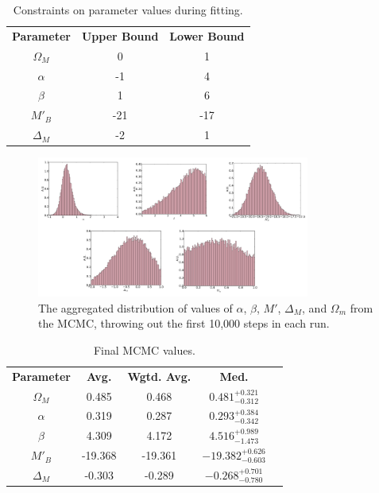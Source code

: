 \documentclass[aps,prl,reprint]{revtex4-1}
\begin{document}
\begin{table}
\begin{center}
\begin{tabular}{ |c|c|c| } 
 \hline
 \textbf{Parameter} & \textbf{Upper Bound} & \textbf{Lower Bound} \\ 
 $\Omega_M$ & 0 & 1 \\ 
 $\alpha$ & -1 & 4 \\ 
 $\beta$ & 1 & 6 \\ 
 $M'_B$ & -21 & -17 \\ 
$\Delta_M$ & -2 & 1 \\ 
 \hline
\end{tabular}
\caption{Constraints on parameter values during fitting.}\label{bounds}
\end{center}
\end{table}
\FloatBarrier
\onecolumngrid

\begin{figure}
\includegraphics[width=0.8\textwidth]{../plots/SN_hist.pdf}
\caption{\label{fig:hist}The aggregated distribution of values of $\alpha$, $\beta$, $M'$, $\Delta_M$, and $\Omega_m$ from the MCMC, throwing out the first 10,000 steps in each run.}
\end{figure}
\twocolumngrid
\begin{table}[t]
\begin{center}
\def\arraystretch{1.5}
\begin{tabular}{ |c|c|c|c|c| } 
 \hline
 \textbf{Parameter} & \textbf{Avg.} & \textbf{Wgtd. Avg.} & \textbf{Med.} \\ 
 $\Omega_M$ & 0.485 & 0.468 & $0.481^{+0.321}_{-0.312}$\\ 
 $\alpha$ & 0.319 & 0.287 & $0.293^{+0.384}_{-0.342}$\\ 
 $\beta$ & 4.309 & 4.172 &  $4.516^{+0.989}_{-1.473}$\\ 
 $M'_B$ & -19.368 & -19.361 & $-19.382^{+0.626}_{-0.603}$ \\ 
$\Delta_M$ & -0.303 &-0.289 & $-0.268^{+0.701}_{-0.780}$ \\
 \hline
\end{tabular}
 \caption{Final MCMC values.}\label{tblv}
\end{center}
\end{table}
\end{document}
